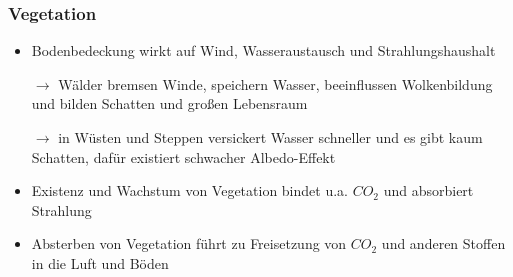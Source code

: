 \begin{frame}
	\frametitle{Vegetation}
		\begin{itemize}
			\item Bodenbedeckung wirkt auf Wind, Wasseraustausch und Strahlungshaushalt
			\item [$\rightarrow$] Wälder bremsen Winde, speichern Wasser, beeinflussen Wolkenbildung und bilden Schatten und großen Lebensraum
			\item [$\rightarrow$] in Wüsten und Steppen versickert Wasser schneller und es gibt kaum Schatten, dafür existiert schwacher Albedo-Effekt
			\item Existenz und Wachstum von Vegetation bindet u.a. $CO_2$ und absorbiert Strahlung
			\item Absterben von Vegetation führt zu Freisetzung von $CO_2$ und anderen Stoffen in die Luft und Böden %
		\end{itemize}
	
\end{frame}


